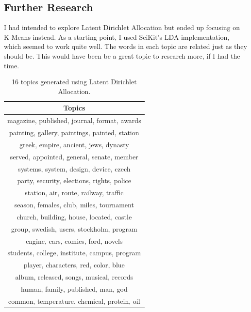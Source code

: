 \documentclass{article} %
\begin{document}
\subsection{Further Research}

I had intended to explore Latent Dirichlet Allocation but ended up focusing on K-Means instead. As a starting point, I used SciKit's LDA implementation, which seemed to work quite well. The words in each topic are related just as they should be. This would have been be a great topic to research more, if I had the time.

\begin{table}[!htb]
\caption{16 topics generated using Latent Dirichlet Allocation.}
\label{most-common-words-table}
\begin{center}
    \begin{tabular}{ | c | }
    \hline
    \textbf{Topics} \\ \hline

magazine, published, journal, format, awards \\ \hline 
painting, gallery, paintings, painted, station \\ \hline 
greek, empire, ancient, jews, dynasty \\ \hline 
served, appointed, general, senate, member \\ \hline 
systems, system, design, device, czech \\ \hline 
party, security, elections, rights, police \\ \hline 
station, air, route, railway, traffic \\ \hline 
season, females, club, miles, tournament \\ \hline 
church, building, house, located, castle \\ \hline 
group, swedish, users, stockholm, program \\ \hline 
engine, cars, comics, ford, novels \\ \hline 
students, college, institute, campus, program \\ \hline 
player, characters, red, color, blue \\ \hline 
album, released, songs, musical, records \\ \hline 
human, family, published, man, god \\ \hline 
common, temperature, chemical, protein, oil \\ \hline 

\end{tabular}
\end{center}
\end{table}
\end{document}
